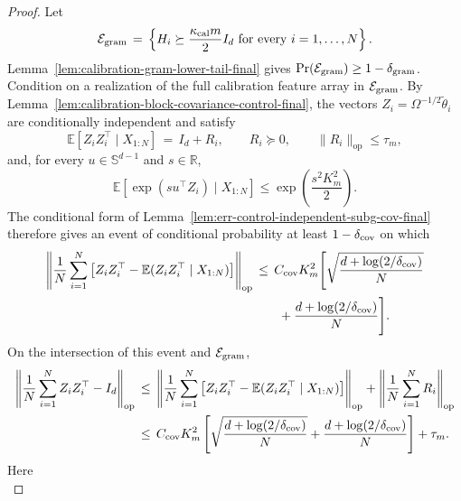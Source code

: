 \documentclass{article} %
\begin{document}
\begin{proof}
Let
\begin{equation}
\mathcal{E}_{\rm gram}
\,=\,
\left\{
H_i\succeq \frac{\kappa_{\rm cal}m}{2}I_d
\text{ for every }i=1,\ldots,N
\right\}.
\end{equation}
Lemma~\ref{lem:calibration-gram-lower-tail-final} gives
\(\Pr(\mathcal{E}_{\rm gram})\geq1-\delta_{\rm gram}\).
Condition on a realization of the full calibration feature array in
\(\mathcal{E}_{\rm gram}\). By
Lemma~\ref{lem:calibration-block-covariance-control-final}, the vectors
\(Z_i=\Omega^{-1/2}\widetilde\theta_i\) are conditionally independent and
satisfy
\begin{equation}
\mathbb{E}[Z_iZ_i^\top\mid X_{1:N}]
\,=\,
I_d+R_i,
\qquad
R_i\succeq0,
\qquad
\|R_i\|_{\mathrm{op}}\leq\tau_m,
\end{equation}
and, for every \(u\in\mathbb{S}^{d-1}\) and \(s\in\mathbb{R}\),
\begin{equation}
\mathbb{E}\!\left[
\exp(su^\top Z_i)\mid X_{1:N}
\right]
\leq
\exp\!\left(\frac{s^2K_m^2}{2}\right).
\end{equation}
The conditional form of
Lemma~\ref{lem:err-control-independent-subg-cov-final} therefore gives an
event of conditional probability at least \(1-\delta_{\rm cov}\) on which
\begin{equation}
\begin{aligned}
\left\|
\frac1N\sum_{i=1}^N
\left[
Z_iZ_i^\top-\mathbb{E}(Z_iZ_i^\top\mid X_{1:N})
\right]
\right\|_{\mathrm{op}}
&\,\leq\,
C_{\rm cov}K_m^2\Biggl[
\sqrt{\frac{d+\log(2/\delta_{\rm cov})}{N}}
\\
&\qquad
+
\frac{d+\log(2/\delta_{\rm cov})}{N}
\Biggr].
\end{aligned}
\end{equation}
On the intersection of this event and \(\mathcal{E}_{\rm gram}\),
\begin{equation}
\begin{aligned}
\left\|
\frac1N\sum_{i=1}^N Z_iZ_i^\top-I_d
\right\|_{\mathrm{op}}
&\,\leq\,
\left\|
\frac1N\sum_{i=1}^N
\left[
Z_iZ_i^\top-\mathbb{E}(Z_iZ_i^\top\mid X_{1:N})
\right]
\right\|_{\mathrm{op}}
+
\left\|\frac1N\sum_{i=1}^N R_i\right\|_{\mathrm{op}}
\\
&\,\leq\,
C_{\rm cov}K_m^2\left[
\sqrt{\frac{d+\log(2/\delta_{\rm cov})}{N}}
+
\frac{d+\log(2/\delta_{\rm cov})}{N}
\right]+\tau_m.
\end{aligned}
\end{equation}
Here
\begin{equation}

\end{equation}
\end{proof}
\end{document}
